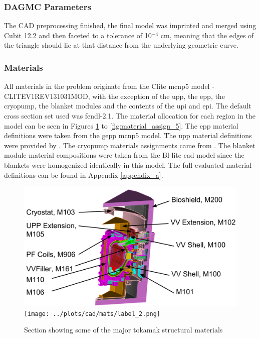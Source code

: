 \documentclass[12pt]{article}
\begin{document}
\subsubsection{DAGMC Parameters}
The CAD preprocessing finished, the final model was imprinted and merged using
Cubit 12.2 and then faceted to a tolerance of 10$^{-4}$ cm, meaning that the
edges of the triangle should lie at that distance from the underlying geometric
curve.
\newpage
\clearpage
\subsubsection{Materials}
All materials in the problem originate from the Clite \gls{mcnp5} model -
CLITE\textunderscore V1\textunderscore REV131031\textunderscore MOD, with the
exception of the \gls{upp}, the \gls{epp}, the
cryopump, the blanket modules and the contents of the \gls{upi} and \gls{epi}.
The default cross section set used was \gls{fendl}-2.1. The material allocation
for each region in the model can be seen in Figures \ref{fig:material_assign_1} 
to \ref{fig:material_assign_5}. The \gls{epp} material 
definitions were taken from the \gls{gepp} \gls{mcnp5} model\cite{epp_materials}.
The \gls{upp} material definitions were provided by 
\cite{bertalot_communication}. The cryopump materials assignments
came from \cite{cryopump_communication}. The blanket module material
compositions were taken from the Bl-lite \gls{cad} model since the blankets were
homogenized identically in this model. The full evaluated material definitions
can be found in Appendix \ref{appendix_a}.
\begin{figure}[p]
  \centering
  \includegraphics[scale=0.32]{../plots/cad/mats/label_1.png}
  \texttt{[image: ../plots/cad/mats/label\_2.png]}
  \caption{Section showing some of the major tokamak structural materials}
  \label{fig:material_assign_1}
\end{figure}
\end{document}
